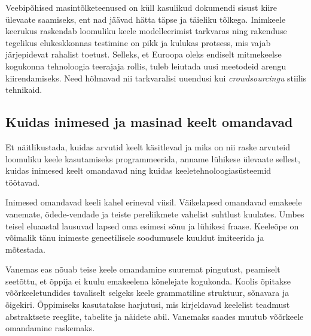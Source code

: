 \begin{multicols}{2}


Veebipõhised masintõlketeenused on küll kasulikud dokumendi sisust kiire ülevaate saamiseks, ent nad jäävad hätta täpse ja täieliku tõlkega. Inimkeele keerukus raskendab loomuliku keele modelleerimist tarkvaras ning raken\-duse tegelikus elukeskkonnas testimine on pikk ja kulukas protsess, mis vajab järjepidevat rahalist toetust. Sel\-leks, et Euroopa oleks endiselt mitmekeelse kogukonna tehnoloogia tee\-rajaja rollis, tuleb leiutada uusi meetodeid arengu kii\-ren\-da\-miseks.  Need hõlmavad nii tark\-varalisi uuendusi kui \textit{crowdsourcingu} stiilis tehnikaid.

\subsection{Kuidas inimesed ja masinad keelt omandavad}

Et näitlikustada, kuidas arvutid keelt käsitlevad ja miks on nii raske arvuteid loomuliku keele kasutamiseks programmeerida, anname lühikese ülevaate sellest, kuidas inimesed keelt omandavad ning kuidas keeletehnoloogiasüsteemid töötavad.



Inimesed omandavad keeli kahel erineval viisil.  Väikelapsed omandavad emakeele vanemate, õdede-vendade ja teiste pere\-liikmete vahelist suhtlust kuulates.  Umbes teisel eluaastal lausuvad lapsed oma esi\-mesi sõnu ja lühikesi fraase.  Keeleõpe on võimalik tänu inimeste geneetilisele soodumusele kuuldut imiteerida ja mõtestada.

Vanemas eas nõuab teise keele omandamine suuremat pingutust, peamiselt seetõttu, et õppija ei kuulu emakeelena kõnelejate kogukonda.  Koolis õpitakse võõrkeeletundides tavaliselt selgeks keele grammatiline struktuur, sõnavara ja õigekiri.  Õppimiseks kasutatakse harjutusi, mis kirjeldavad keelelist teadmust abstraktsete reeglite, tabelite ja näidete abil.  Vanemaks saades muutub võõrkeele omandamine raskemaks.


\end{multicols}
